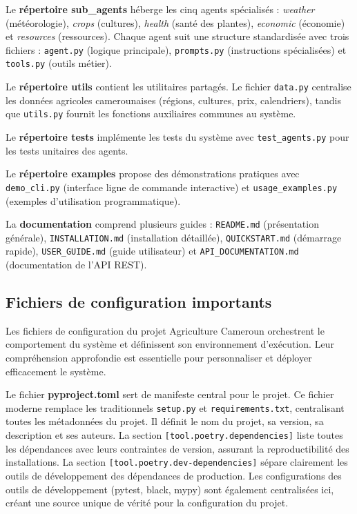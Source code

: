 Le \textbf{répertoire sub\_agents} héberge les cinq agents spécialisés : \textit{weather} (météorologie), \textit{crops} (cultures), \textit{health} (santé des plantes), \textit{economic} (économie) et \textit{resources} (ressources). Chaque agent suit une structure standardisée avec trois fichiers : \texttt{agent.py} (logique principale), \texttt{prompts.py} (instructions spécialisées) et \texttt{tools.py} (outils métier).

Le \textbf{répertoire utils} contient les utilitaires partagés. Le fichier \texttt{data.py} centralise les données agricoles camerounaises (régions, cultures, prix, calendriers), tandis que \texttt{utils.py} fournit les fonctions auxiliaires communes au système.

Le \textbf{répertoire tests} implémente les tests du système avec \texttt{test\_agents.py} pour les tests unitaires des agents.

Le \textbf{répertoire examples} propose des démonstrations pratiques avec \texttt{demo\_cli.py} (interface ligne de commande interactive) et \texttt{usage\_examples.py} (exemples d'utilisation programmatique).

La \textbf{documentation} comprend plusieurs guides : \texttt{README.md} (présentation générale), \texttt{INSTALLATION.md} (installation détaillée), \texttt{QUICKSTART.md} (démarrage rapide), \texttt{USER\_GUIDE.md} (guide utilisateur) et \texttt{API\_DOCUMENTATION.md} (documentation de l'API REST).

\subsection{Fichiers de configuration importants}

Les fichiers de configuration du projet Agriculture Cameroun orchestrent le comportement du système et définissent son environnement d'exécution. Leur compréhension approfondie est essentielle pour personnaliser et déployer efficacement le système.

Le fichier \textbf{pyproject.toml} sert de manifeste central pour le projet. Ce fichier moderne remplace les traditionnels \texttt{setup.py} et \texttt{requirements.txt}, centralisant toutes les métadonnées du projet. Il définit le nom du projet, sa version, sa description et ses auteurs. La section \texttt{[tool.poetry.dependencies]} liste toutes les dépendances avec leurs contraintes de version, assurant la reproductibilité des installations. La section \texttt{[tool.poetry.dev-dependencies]} sépare clairement les outils de développement des dépendances de production. Les configurations des outils de développement (pytest, black, mypy) sont également centralisées ici, créant une source unique de vérité pour la configuration du projet.

